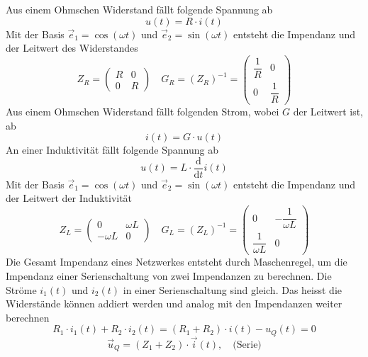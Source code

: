 Aus einem Ohmschen Widerstand fällt folgende Spannung ab
\begin{equation}
\boxed{u(t)=R\cdot i(t)}
\end{equation}
Mit der Basis $\overrightarrow{e}_1=\cos\left(\omega t\right)$ und $\overrightarrow{e}_2=\sin\left(\omega t\right)$ entsteht die Impendanz und der Leitwert des Widerstandes
\begin{equation}
\boxed{Z_R=\begin{pmatrix}R&0\\0&R\end{pmatrix}}\quad \boxed{G_R=\left(Z_R\right)^{-1}=\begin{pmatrix}\dfrac{1}{R}&0\\0&\dfrac{1}{R}\end{pmatrix}}
\end{equation}
Aus einem Ohmschen Widerstand fällt folgenden Strom, wobei $G$ der Leitwert ist, ab
\begin{equation}
\boxed{i(t)=G\cdot u(t)}
\end{equation}
An einer Induktivität fällt folgende Spannung ab
\begin{equation}
\boxed{u(t)=L\cdot \dfrac{\text{d}}{\text{d}t}i(t)}
\end{equation}
Mit der Basis $\overrightarrow{e}_1=\cos\left(\omega t\right)$ und $\overrightarrow{e}_2=\sin\left(\omega t\right)$ entsteht die Impendanz und der Leitwert der Induktivität
\begin{equation}
\boxed{Z_L=\begin{pmatrix}0&\omega L\\-\omega L&0\end{pmatrix}}\quad \boxed{G_L=\left(Z_L\right)^{-1}=\begin{pmatrix}0&-\dfrac{1}{\omega L}\\\dfrac{1}{\omega L}&0\end{pmatrix}}
\end{equation}
Die Gesamt Impendanz eines Netzwerkes entsteht durch Maschenregel, um die Impendanz einer Serienschaltung von zwei Impendanzen zu berechnen. Die Ströme $i_1(t)$ und $i_2(t)$ in einer Serienschaltung sind gleich. Das heisst die Widerstände können addiert werden und analog mit den Impendanzen weiter berechnen
\begin{equation}
R_1\cdot i_1(t)+R_2\cdot i_2(t)=\left(R_1+R_2\right)\cdot i(t)-u_Q\left(t\right)=0
\end{equation}
\begin{equation}
\boxed{\overrightarrow{u}_Q=\left(Z_1+Z_2\right)\cdot \overrightarrow{i}(t),\quad \text{(Serie)}}
\end{equation}
